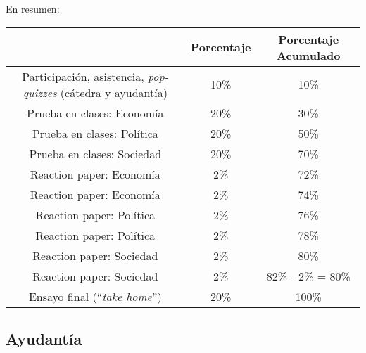 \documentclass[letterpaper]{article}
\renewenvironment{itemize}{
  \begin{list}{}{
    \setlength{\leftmargin}{1.5em}
  }
}{
  \end{list}
}
\begin{document}
\newpage
	En resumen:\\

	\begin{table}[h]
\begin{tabular}{ccc}
							& \textbf{Porcentaje} & {\bf Porcentaje Acumulado} \\
							\hline
Participaci\'on, asistencia, \emph{pop-quizzes} (c\'atedra y ayudant\'ia) & 10\%       & 10\%                 \\
\hline
Prueba en clases: Econom\'ia                                            & 20\%                & 30\%                 \\
Prueba en clases: Pol\'itica                                            & 20\%                & 50\%                 \\
Prueba en clases: Sociedad                                            & 20\%                & 70\%                 \\
\hline
Reaction paper: Econom\'ia                                              & 2\%                 & 72\%                 \\
Reaction paper: Econom\'ia                                              & 2\%                 & 74\%                 \\
Reaction paper: Pol\'itica                                              & 2\%                 & 76\%                 \\
Reaction paper: Pol\'itica                                              & 2\%                 & 78\%                 \\
Reaction paper: Sociedad                                              & 2\%                 & 80\%                 \\
Reaction paper: Sociedad                                              & 2\%                 & 82\% - 2\% = 80\%    \\
\hline
Ensayo final (``\emph{take home}'')                                            & 20\%                & 100\% \\
\hline             
\end{tabular}
\end{table}

\subsection*{Ayudant\'ia}

\begin{itemize}
    \item[\Pointinghand] {\color{blue}{\bf Las ayudant\'ias comienzan la semana del 1 de abril.}}
\end{itemize}
\end{document}
